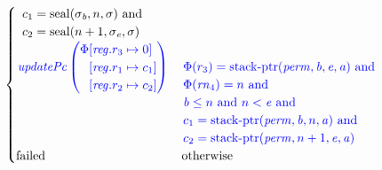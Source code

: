 \documentclass[a4paper]{article}
\begin{document}
\begin{align*}
\begin{cases}
\begin{array}[t]{l}
                                   c_1 = \seal{\sigma_\baddr,n,\sigma} \tand \\
                                   c_2 = \seal{n+1,\sigma_\eaddr,\sigma}         
                                 \end{array}\\
                                   \sourcecolor\left.
                                   \updPcAddr{}\left(
                                   \arraycolsep=0pt
                                   \begin{array}{rl}
                                     \Phi&\updReg{r_3}{0}\\
                                               &\updReg{r_1}{c_1}\\
                                               &\updReg{r_2}{c_2}
                                   \end{array} \right)\right.
&
                                 \sourcecolor\left.
                                 \arraycolsep=0pt
                                 \begin{array}[t]{l}
                                   \Phi(r_3) = \stkptr{\perm,\baddr,\eaddr,\aaddr} \tand \\
                                   \Phi(\rn_4) = n \tand \\
                                   \baddr \leq n \tand n < \eaddr \tand \\
                                   c_1 = \stkptr{\perm,\baddr,n,\aaddr} \tand \\
                                   c_2 = \stkptr{\perm,n+1,\eaddr,\aaddr} 
                                 \end{array} \right.\\
                                 \failed & \totherwise
                               \end{cases}
\end{align*}
\end{document}
